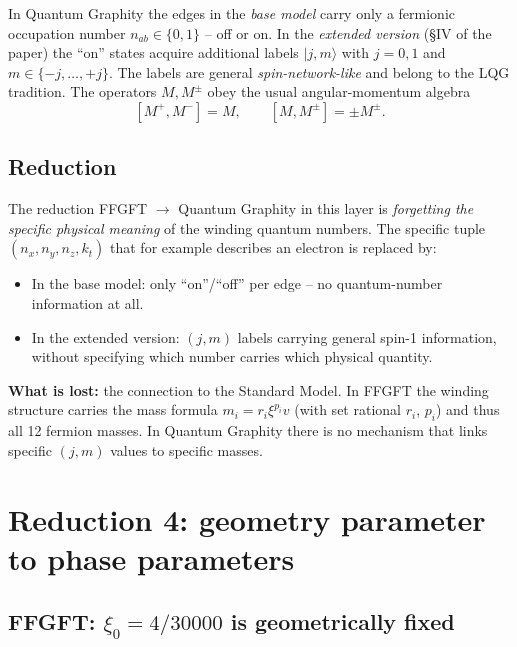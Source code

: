 In Quantum Graphity the edges in the \emph{base model} carry only a
fermionic occupation number $n_{ab} \in \{0, 1\}$ -- off or on. In
the \emph{extended version} (§IV of the paper) the \enquote{on}
states acquire additional labels $|j, m\rangle$ with $j = 0, 1$ and
$m \in \{-j, \ldots, +j\}$. The labels are general
\emph{spin-network-like} and belong to the LQG tradition. The
operators $M, M^\pm$ obey the usual angular-momentum algebra
\[
  [M^+, M^-] = M, \qquad [M, M^\pm] = \pm M^\pm.
\]

\subsection{Reduction}

The reduction FFGFT $\to$ Quantum Graphity in this layer is
\emph{forgetting the specific physical meaning} of the winding
quantum numbers. The specific tuple $(n_x, n_y, n_z, k_t)$ that for
example describes an electron is replaced by:
\begin{itemize}[leftmargin=2em,itemsep=2pt,topsep=2pt]
  \item In the base model: only \enquote{on}/\enquote{off} per edge --
        no quantum-number information at all.
  \item In the extended version: $(j, m)$ labels carrying general
        spin-1 information, without specifying which number carries
        which physical quantity.
\end{itemize}

\textbf{What is lost:} the connection to the Standard Model. In
FFGFT the winding structure carries the mass formula
$m_i = r_i \xi^{p_i} v$ (with set rational $r_i$, $p_i$) and thus all
12 fermion masses. In Quantum
Graphity there is no mechanism that links specific $(j, m)$ values
to specific masses.

\section{Reduction 4: geometry parameter to phase parameters}

\subsection{\texorpdfstring{FFGFT: $\xi_0 = 4/30000$ is geometrically fixed}{FFGFT: xi0 = 4/30000 is geometrically fixed}}


